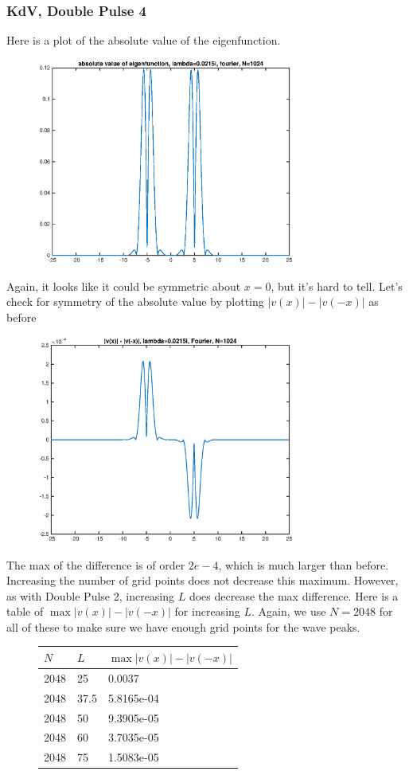 \documentclass[12pt]{article}
\begin{document}
\subsubsection*{KdV, Double Pulse 4}
Here is a plot of the absolute value of the eigenfunction.
\begin{figure}[H]
\includegraphics[width=8.5cm]{4doubleabseigenfn}
\end{figure}
Again, it looks like it could be symmetric about $x = 0$, but it's hard to tell. Let's check for symmetry of the absolute value by plotting $|v(x)| - |v(-x)|$ as before
\begin{figure}[H]
\includegraphics[width=8.5cm]{4doubleabseigenfnflipdiff}
\end{figure}
The max of the difference is of order $2e-4$, which is much larger than before. Increasing the number of grid points does not decrease this maximum. However, as with Double Pulse 2, increasing $L$ does decrease the max difference. Here is a table of $\max{|v(x)| - |v(-x)|}$ for increasing $L$. Again, we use $N = 2048$ for all of these to make sure we have enough grid points for the wave peaks.

\begin{figure}[H]
\begin{tabular}{l|ll}
  $N$   &  $L$   & $\max{|v(x)| - |v(-x)|}$ \\ \hline
  2048  &    25  &   0.0037 \\ 
  2048  &  37.5  &   5.8165e-04 \\
  2048  &    50  &   9.3905e-05 \\ 
  2048  &    60  &   3.7035e-05\\
  2048  &    75  &   1.5083e-05 \\
\end{tabular}
\end{figure}
\end{document}
